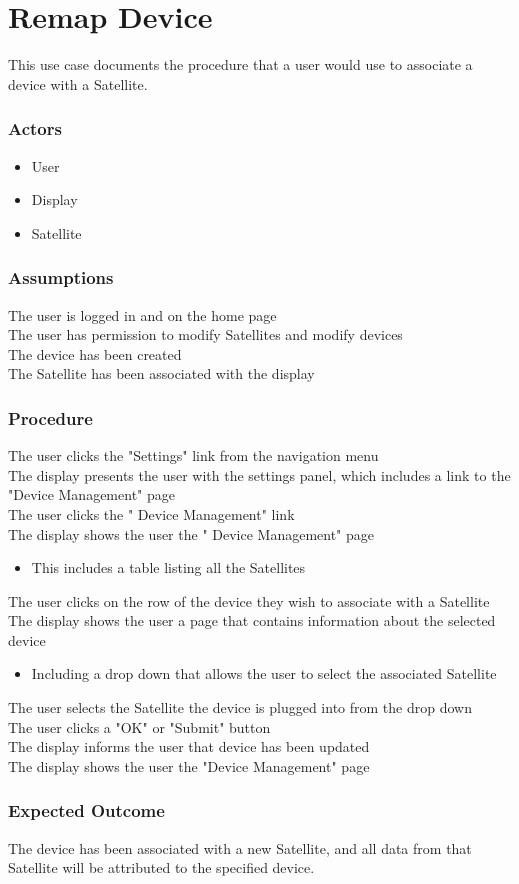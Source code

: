 \section{Remap Device}

This use case documents the procedure that a user would use to associate a device with a Satellite.

\subsubsection{Actors}
\begin{itemize}
	\item User
	\item Display
	\item Satellite
\end{itemize}

\subsubsection{Assumptions}

The user is logged in and on the home page\\
The user has permission to modify Satellites and modify devices\\
The device has been created\\
The Satellite has been associated with the display

\subsubsection{Procedure}

The user clicks the "Settings" link from the navigation menu\\
The display presents the user with the settings panel, which includes a link to the "Device Management" page\\
The user clicks the " Device Management" link\\
The display shows the user the " Device Management" page
\begin{itemize}
	\item This includes a table listing all the Satellites
\end{itemize}
The user clicks on the row of the device they wish to associate with a Satellite\\
The display shows the user a page that contains information about the selected device
\begin{itemize}
	\item Including a drop down that allows the user to select the associated Satellite
\end{itemize}
The user selects the Satellite the device is plugged into from the drop down\\
The user clicks a "OK" or "Submit" button\\
The display informs the user that device has been updated\\
The display shows the user the "Device Management" page

\subsubsection{Expected Outcome}

The device has been associated with a new Satellite, and all data from that Satellite will be attributed to the specified device.